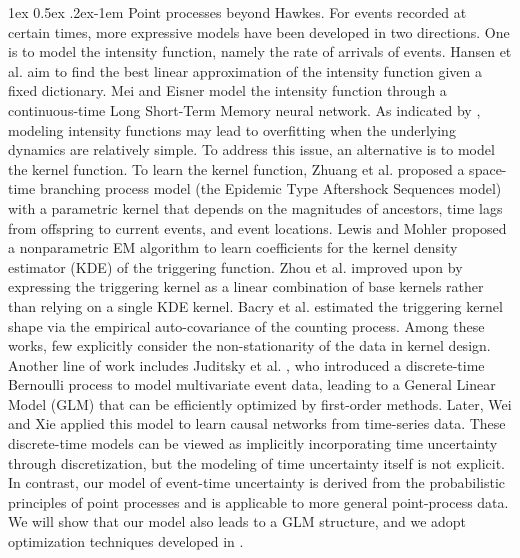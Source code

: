 \documentclass[11pt]{article}
\makeatletter
\theoremstyle{remark}
\theoremstyle{plain}
\renewcommand{\paragraph}{%
  \@startsection{paragraph}{4}%
  {\z@}{1ex \@plus 0.5ex \@minus .2ex}{-1em}%
  {\normalfont\normalsize\itshape}%
}
\makeatother
\begin{document}
\paragraph{Point processes beyond Hawkes.} For events recorded at certain times, more expressive models have been developed in two directions. One is to model the intensity function, namely the rate of arrivals of events. Hansen et al. \cite{hansen2015lasso} aim to find the best linear approximation of the intensity function given a fixed dictionary. Mei and Eisner \cite{mei2017neural} model the intensity function through a continuous-time Long Short-Term Memory neural network. As indicated by \cite{dong2022spatio}, modeling intensity functions may lead to overfitting when the underlying dynamics are relatively simple. To address this issue, an alternative is to model the kernel function.
To learn the kernel function, Zhuang et al. \cite{zhuang2002stochastic} proposed a space-time branching process model (the Epidemic Type Aftershock Sequences model) with a parametric kernel that depends on the magnitudes of ancestors, time lags from offspring to current events, and event locations. Lewis and Mohler \cite{lewis2011nonparametric} proposed a nonparametric EM algorithm to learn coefficients for the kernel density estimator (KDE) of the triggering function. Zhou et al. \cite{zhou2013learningb} improved upon \cite{lewis2011nonparametric} by expressing the triggering kernel as a linear combination of base kernels rather than relying on a single KDE kernel. Bacry et al. \cite{bacry2012non} estimated the triggering kernel shape via the empirical auto-covariance of the counting process. Among these works, few explicitly consider the non-stationarity of the data in kernel design.
Another line of work includes Juditsky et al. \cite{juditsky2020convex}, who introduced a discrete-time Bernoulli process to model multivariate event data, leading to a General Linear Model (GLM) that can be efficiently optimized by first-order methods. Later, Wei and Xie \cite{wei2023causal} applied this model to learn causal networks from time-series data. These discrete-time models can be viewed as implicitly incorporating time uncertainty through discretization, but the modeling of time uncertainty itself is not explicit. In contrast, our model of event-time uncertainty is derived from the probabilistic principles of point processes and is applicable to more general point-process data. We will show that our model also leads to a GLM structure, and we adopt optimization techniques developed in \cite{juditsky2020convex}.
\end{document}
